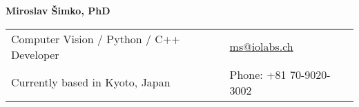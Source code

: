 \documentclass[a4paper,11pt,oneside]{article}
\begin{document}

\noindent  \LARGE{\textbf{Miroslav Šimko, PhD}}  \\
\vspace{-2ex}
\normalsize


\begin{center}
\begin{tabular}{l l}
 Computer Vision / Python / C++ Developer & \hspace{1in} \href{mailto:ms@iolabs.ch}{ms@iolabs.ch} \\
  Currently based in Kyoto, Japan & \hspace{1in} Phone: +81 70-9020-3002 \\
  \end{tabular}
  \end{center}

  \vspace{1em}

\end{document}
